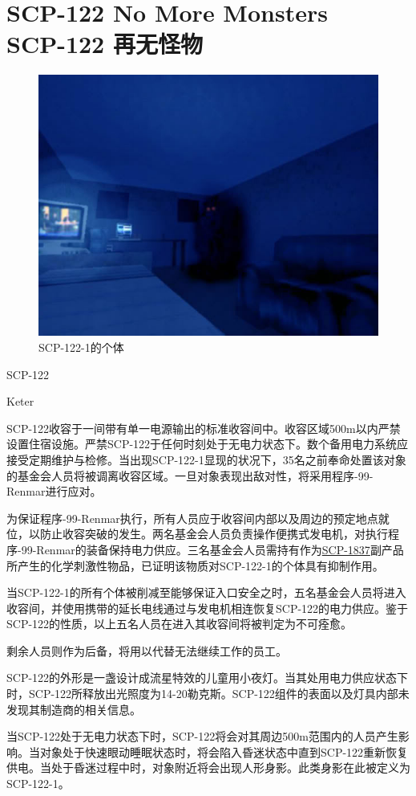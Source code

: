 \chapter[SCP-122 再无怪物]{
    SCP-122 No More Monsters\\
    SCP-122 再无怪物
}

\label{chap:SCP-122}

\begin{figure}[H]
    \centering
    \includegraphics[width=0.5\linewidth]{images/SCP.122.jpg}
    \caption*{SCP-122-1的个体}
\end{figure}

SCP-122

Keter

SCP-122收容于一间带有单一电源输出的标准收容间中。收容区域500m以内严禁设置住宿设施。严禁SCP-122于任何时刻处于无电力状态下。数个备用电力系统应接受定期维护与检修。当出现SCP-122-1显现的状况下，35名之前奉命处置该对象的基金会人员将被调离收容区域。一旦对象表现出敌对性，将采用程序-99-Renmar进行应对。

为保证程序-99-Renmar执行，所有人员应于收容间内部以及周边的预定地点就位，以防止收容突破的发生。两名基金会人员负责操作便携式发电机，对执行程序-99-Renmar的装备保持电力供应。三名基金会人员需持有作为\hyperref[chap:SCP-1837]{SCP-1837}副产品所产生的化学刺激性物品，已证明该物质对SCP-122-1的个体具有抑制作用。

当SCP-122-1的所有个体被削减至能够保证入口安全之时，五名基金会人员将进入收容间，并使用携带的延长电线通过与发电机相连恢复SCP-122的电力供应。鉴于SCP-122的性质，以上五名人员在进入其收容间将被判定为不可痊愈。

剩余人员则作为后备，将用以代替无法继续工作的员工。

SCP-122的外形是一盏设计成流星特效的儿童用小夜灯。当其处用电力供应状态下时，SCP-122所释放出光照度为14-20勒克斯。SCP-122组件的表面以及灯具内部未发现其制造商的相关信息。

当SCP-122处于无电力状态下时，SCP-122将会对其周边500m范围内的人员产生影响。当对象处于快速眼动睡眠状态时，将会陷入昏迷状态中直到SCP-122重新恢复供电。当处于昏迷过程中时，对象附近将会出现人形身影。此类身影在此被定义为SCP-122-1。

